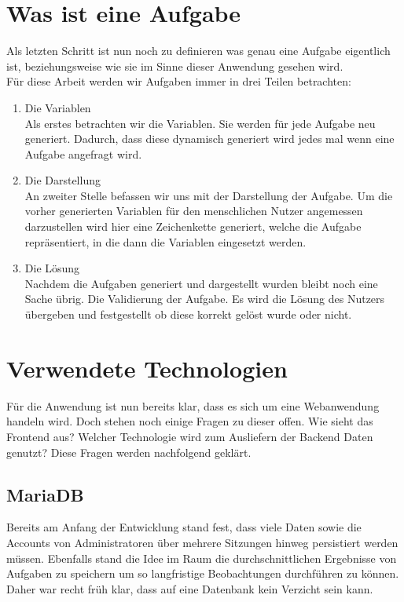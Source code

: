 \section{Was ist eine Aufgabe}

Als letzten Schritt ist nun noch zu definieren was genau eine Aufgabe eigentlich ist, beziehungsweise wie sie im Sinne dieser Anwendung gesehen wird. \\
Für diese Arbeit werden wir Aufgaben immer in drei Teilen betrachten:
\begin{enumerate}
\item Die Variablen \\
Als erstes betrachten wir die Variablen. Sie werden für jede Aufgabe neu generiert. Dadurch, dass diese dynamisch generiert wird jedes mal wenn eine Aufgabe angefragt wird.
\item Die Darstellung \\
An zweiter Stelle befassen wir uns mit der Darstellung der Aufgabe. Um die vorher generierten Variablen für den menschlichen Nutzer angemessen darzustellen wird hier eine Zeichenkette generiert, welche die Aufgabe repräsentiert, in die dann die Variablen eingesetzt werden.
\item Die Lösung \\
Nachdem die Aufgaben generiert und dargestellt wurden bleibt noch eine Sache übrig. Die Validierung der Aufgabe. Es wird die Lösung des Nutzers übergeben und festgestellt ob diese korrekt gelöst wurde oder nicht.
\end{enumerate}

\section{Verwendete Technologien}

Für die Anwendung ist nun bereits klar, dass es sich um eine Webanwendung handeln wird. Doch stehen noch einige Fragen zu dieser offen. Wie sieht das Frontend aus? Welcher Technologie wird zum Ausliefern der Backend Daten genutzt? Diese Fragen werden nachfolgend geklärt.


\subsection{MariaDB}

Bereits am Anfang der Entwicklung stand fest, dass viele Daten sowie die Accounts von Administratoren über mehrere Sitzungen hinweg persistiert werden müssen. Ebenfalls stand die Idee im Raum die durchschnittlichen Ergebnisse von Aufgaben zu speichern um so langfristige Beobachtungen durchführen zu können. Daher war recht früh klar, dass auf eine Datenbank kein Verzicht sein kann. \\

